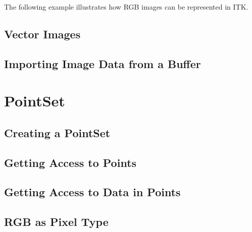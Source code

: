 The following example illustrates how RGB images can be represented in ITK.

\label{sec:DefiningRGBImages}
%


\subsection{Vector Images}

%


\subsection{Importing Image Data from a Buffer}
\label{sec:ImportingImageDataFromABuffer}
%



\section{PointSet}
\label{PointSetSection}

\subsection{Creating a PointSet}
\label{sec:CreatingAPointSet}

%



\subsection{Getting Access to Points}
\label{sec:GettingAccessToPointsInThePointSet}

%



\subsection{Getting Access to Data in Points}
\label{sec:GettingAccessToDataInThePointSet}

%



\subsection{RGB as Pixel Type}
\label{sec:PointSetWithRGBAsPixelType}

%




